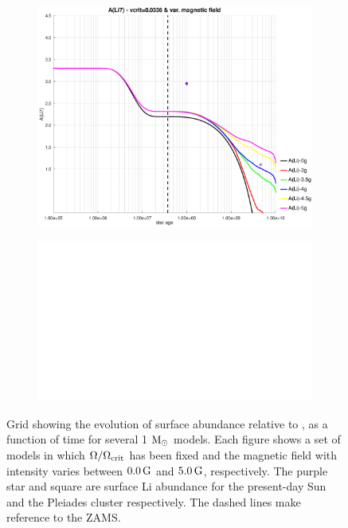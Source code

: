 \documentclass[fleqn,usenatbib]{mnras}
\begin{document}
\begin{figure}
\begin{subfigure}[h]{0.47\textwidth}
    \includegraphics[trim = 35mm 15mm 15mm 15mm, clip,width=\textwidth]{figures/li_vc_0336_var_g.eps}
    \label{fig:subim25}
    \end{subfigure}
    \begin{subfigure}[h]{0.47\textwidth}
    \includegraphics[width=\textwidth]{figures/blank.eps}
    \label{fig:subim26}
    \end{subfigure}
\caption{Grid showing the evolution of surface  abundance relative to , as a function of time for several 1 $\mathrm{M}_\odot$ models. Each figure shows a set of models in which $\Omega / \Omega_{\mathrm{crit}}$ has been fixed and the magnetic field with intensity varies between $0.0\,\mathrm{G}$ and $5.0\,\mathrm{G}$, respectively. The purple star and square are surface Li abundance for the present-day Sun \citep{Asplund2009} and the Pleiades cluster \citep{Sestito2005} respectively. The dashed lines make reference to the ZAMS.}
\label{fig:grid_li_var_g}
\end{figure}
\end{document}
